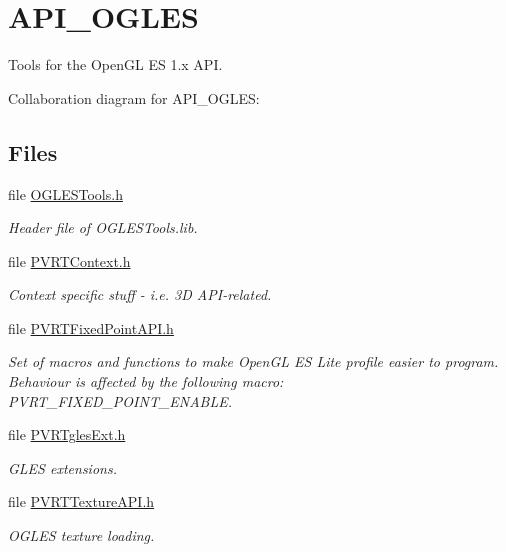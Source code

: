 \hypertarget{group___a_p_i___o_g_l_e_s}{\section{A\+P\+I\+\_\+\+O\+G\+L\+E\+S}
\label{group___a_p_i___o_g_l_e_s}
}


Tools for the Open\+G\+L E\+S 1.\+x A\+P\+I.  


Collaboration diagram for A\+P\+I\+\_\+\+O\+G\+L\+E\+S\+:
\subsection*{Files}
\begin{DoxyCompactItemize}
\item 
file \hyperlink{_o_g_l_e_s_tools_8h}{O\+G\+L\+E\+S\+Tools.\+h}
\begin{DoxyCompactList}\small\item\em Header file of O\+G\+L\+E\+S\+Tools.\+lib. \end{DoxyCompactList}\item 
file \hyperlink{_p_v_r_t_context_8h}{P\+V\+R\+T\+Context.\+h}
\begin{DoxyCompactList}\small\item\em Context specific stuff -\/ i.\+e. 3\+D A\+P\+I-\/related. \end{DoxyCompactList}\item 
file \hyperlink{_p_v_r_t_fixed_point_a_p_i_8h}{P\+V\+R\+T\+Fixed\+Point\+A\+P\+I.\+h}
\begin{DoxyCompactList}\small\item\em Set of macros and functions to make Open\+G\+L E\+S Lite profile easier to program. Behaviour is affected by the following macro\+: P\+V\+R\+T\+\_\+\+F\+I\+X\+E\+D\+\_\+\+P\+O\+I\+N\+T\+\_\+\+E\+N\+A\+B\+L\+E. \end{DoxyCompactList}\item 
file \hyperlink{_p_v_r_tgles_ext_8h}{P\+V\+R\+Tgles\+Ext.\+h}
\begin{DoxyCompactList}\small\item\em G\+L\+E\+S extensions. \end{DoxyCompactList}\item 
file \hyperlink{_p_v_r_t_texture_a_p_i_8h}{P\+V\+R\+T\+Texture\+A\+P\+I.\+h}
\begin{DoxyCompactList}\small\item\em O\+G\+L\+E\+S texture loading. \end{DoxyCompactList}\end{DoxyCompactItemize}
